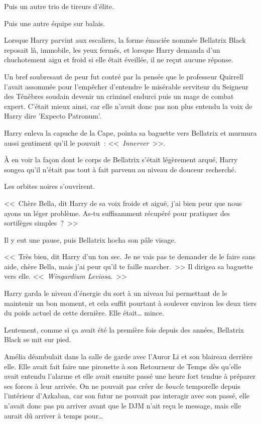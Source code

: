Puis un autre trio de tireurs d'élite.

Puis une autre équipe sur balais.

\later

Lorsque Harry parvint aux escaliers, la forme émaciée nommée Bellatrix Black reposait là, immobile, les yeux fermés, et lorsque Harry demanda d'un chuchotement aigu et froid si elle était éveillée, il ne reçut aucune réponse.

Un bref soubresaut de peur fut contré par la pensée que le professeur Quirrell l'avait assommée pour l'empêcher d'entendre le misérable serviteur du Seigneur des Ténèbres soudain devenir un criminel endurci puis un mage de combat expert. C'était mieux ainsi, car elle n'avait donc pas non plus entendu la voix de Harry dire 'Expecto Patronum'.

Harry enleva la capuche de la Cape, pointa sa baguette vers Bellatrix et murmura aussi gentiment qu'il le pouvait~: <<~\emph{Innerver}~>>.

À en voir la façon dont le corps de Bellatrix s'était légèrement arqué, Harry songea qu'il n'était pas tout à fait parvenu au niveau de douceur recherché.

Les orbites noires s'ouvrirent.

<<~Chère Bella, dit Harry de sa voix froide et aiguë, j'ai bien peur que nous ayons un léger problème. As-tu suffisamment récupéré pour pratiquer des sortilèges simples~?~>>

Il y eut une pause, puis Bellatrix hocha son pâle visage.

<<~Très bien, dit Harry d'un ton sec. Je ne vais pas te demander de le faire sans aide, chère Bella, mais j'ai peur qu'il te faille marcher.~>> Il dirigea sa baguette vers elle. <<~\emph{Wingardium Leviosa}.~>>

Harry garda le niveau d'énergie du sort à un niveau lui permettant de le maintenir un bon moment, et cela suffit pourtant à soulever environ les deux tiers du poids actuel de cette dernière. Elle était… mince.

Lentement, comme si ça avait été la première fois depuis des années, Bellatrix Black se mit sur pied.

\later

Amélia déambulait dans la salle de garde avec l'Auror Li et son blaireau derrière elle. Elle avait fait faire une pirouette à son Retourneur de Temps dès qu'elle avait entendu l'alarme et elle avait ensuite passé une heure fort tendue à préparer ses forces à leur arrivée. On ne pouvait pas créer de \emph{boucle} temporelle depuis l'intérieur d'Azkaban, car son futur ne pouvait pas interagir avec son passé, elle n'avait donc pas pu arriver avant que le DJM n'ait reçu le message, mais elle aurait dû arriver à temps pour…


